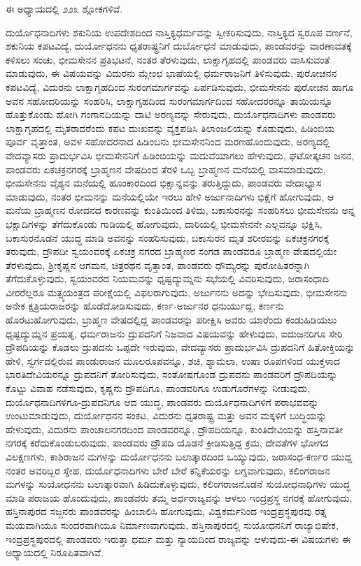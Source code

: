 ಈ ಅಧ್ಯಾಯದಲ್ಲಿ ೨೨೩ ಶ್ಲೋಕಗಳಿವೆ.

ದುರ್ಯೊಧನಾದಿಗಳು ಶಕುನಿಯ ಉಪದೇಶದಿಂದ ನಾಸ್ತಿಕ್ಯಧರ್ಮವನ್ನು ಸ್ವೀಕರಿಸುವುದು, ನಾಸ್ತಿಕ್ಯದ ಸ್ವರೂಪ ವರ್ಣನೆ, ಶಕುನಿಯ ಕಪಟವಿದ್ಯೆ, ದುರ್ಯೋಧನನು ಧೃತರಾಷ್ಟ್ರನಿಗೆ ದುರ್ಬೋಧನೆ ಮಾಡುವುದು, ಪಾಂಡವರನ್ನು ವಾರಣಾವತಕ್ಕೆ ಕಳಿಸಲು ಸಂಚು, ಭೀಮಸೇನನ ಪ್ರತಿಭಟನೆ, ನಂತರ ತೆರಳುವುದು, ಲಾಕ್ಷಾಗೃಹದಲ್ಲಿ ಪಾಂಡವರು ವಾಸಿಸುವಂತೆ ಮಾಡುವುದು, ಈ ವಿಷಯವನ್ನು ವಿದುರನು ಮ್ಲೇಂಛ ಭಾಷೆಯಲ್ಲಿ ಧರ್ಮರಾಜನಿಗೆ ತಿಳಿಸುವುದು, ಪುರೋಚನನ ಕಪಟವಿದ್ಯೆ, ವಿದುರನು ಲಾಕ್ಷಾಗೃಹದಿಂದ ಸುರಂಗಮಾರ್ಗವನ್ನು ಏರ್ಪಡಿಸುವುದು, ಭೀಮಸೇನನು ಪುರೋಚನ ಹಾಗೂ ಅವನ ಸಹೋದರಿ\-ಯನ್ನು ಸಂಹರಿಸಿ, ಲಾಕ್ಷಾಗೃಹದಿಂದ ಸುರಂಗಮಾರ್ಗದಿಂದ ಸಹೋದರರನ್ನೂ ತಾಯಿಯನ್ನೂ ಹೊತ್ತುಕೊಂಡು ಹೋಗಿ ಗಂಗಾನದಿಯನ್ನು ದಾಟಿ ಅರಣ್ಯವನ್ನು ಸೇರುವುದು, ದುರ್ಯೊಧನಾದಿಗಳು ಪಾಂಡವರು ಲಾಕ್ಷಾಗೃಹದಲ್ಲಿ ಮೃತರಾದರೆಂದು ಕಪಟ ದುಃಖವನ್ನು ವ್ಯಕ್ತಪಡಿಸಿ ತಿಲಾಂಜಲಿಯನ್ನು ಕೊಡುವುದು, ಹಿಡಿಂಬಿಯ ಪೂರ್ವ ವೃತ್ತಾಂತ, ಅವಳ ಸಹೋದರನಾದ ಹಿಡಿಂಬನು ಭೀಮಸೇನನಿಂದ ಮರಣಹೊಂದುವುದು, ಅರಣ್ಯದಲ್ಲಿ ವೇದವ್ಯಾಸರು ಪ್ರಾದುರ್ಭವಿಸಿ ಭೀಮಸೇನನಿಗೆ ಹಿಡಿಂಬಿಯನ್ನು ಮದುವೆಯಾಗಲು ಹೇಳುವುದು, ಘಟೋತ್ಕಚನ ಜನನ, ಪಾಂಡವರು ಏಕಚಕ್ರನಗರಕ್ಕೆ ಬ್ರಾಹ್ಮಣನ ವೇಷದಿಂದ ತೆರಳಿ ಒಬ್ಬ ಬ್ರಾಹ್ಮಣನ ಮನೆಯಲ್ಲಿ ವಾಸಮಾಡುವುದು, ಭೀಮಸೇನನು ವೈಶ್ಯನ ಮನೆಯಲ್ಲಿ ಹೂಂಕಾರದಿಂದ ಭಿಕ್ಷಾನ್ನವನ್ನು ತರುತ್ತಿದ್ದುದು, ಪಾಂಡವರು ವೇದಾಭ್ಯಾಸ ಮಾಡುವುದು, ನಂತರ ಭೀಮನನ್ನು ಮನೆಯಲ್ಲಿಯೇ ಇರಲು ಹೇಳಿ ಅರ್ಜುನಾದಿಗಳು ಭಿಕ್ಷೆಗೆ ಹೋಗುವುದು, ಆ ಮನೆಯ ಬ್ರಾಹ್ಮಣನ ರೋದನದ ಕಾರಣವನ್ನು ಕುಂತಿಯಿಂದ ತಿಳಿದು, ಬಕಾಸುರನನ್ನು ಸಂಹರಿಸಲು ಭೀಮಸೇನನು ಅನ್ನ ಭಕ್ಷಾದಿಗಳನ್ನು ತೆಗೆದುಕೊಂಡು ಗಾಡಿಯಲ್ಲಿ ಹೋಗುವುದು, ದಾರಿಯಲ್ಲಿ ಭೀಮಸೇನನೇ ಎಲ್ಲವನ್ನೂ ಭಕ್ಷಿಸಿ, ಬಕಾಸುರನೊಡನೆ ಯುದ್ಧ ಮಾಡಿ ಅವನನ್ನು ಸಂಹರಿಸುವುದು, ಬಕಾಸುರನ ಮೃತ ಶರೀರವನ್ನು ಏಕಚಕ್ರನಗರಕ್ಕೆ ತರುವುದು, ದ್ರೌಪದೀ ಸ್ವಯಂವರಕ್ಕೆ ಏಕಚಕ್ರ ನಗರದ ಬ್ರಾಹ್ಮಣರ ಸಂಗಡ ಪಾಂಡವರೂ ಬ್ರಾಹ್ಮಣ ವೇಷದಲ್ಲಿಯೇ ತೆರಳುವುದು, ಶ‍್ರೀಕೃಷ್ಣನ ಆಗಮನ, ಚಿತ್ರರಥನ ವೃತ್ತಾಂತ, ಪಾಂಡವರು ಧೌಮ್ಯರನ್ನು ಪುರೋಹಿತರನ್ನಾಗಿ ತೆಗೆದುಕೊಳ್ಳುವುದು, ಸ್ವಯಂವರದ ನಿಯಮವನ್ನು ಧೃಷ್ಟ\-ದ್ಯುಮ್ನನು ಸಭೆಯಲ್ಲಿ ವಿವರಿಸುವುದು, ಜರಾಸಂಧಾದಿ ವೀರರೆಲ್ಲರೂ ಮತ್ಸ್ಯಯಂತ್ರದ ಪರೀಕ್ಷೆಯಲ್ಲಿ ವಿಫಲರಾಗುವುದು, ಅರ್ಜುನನು ಅದನ್ನು ಭೇದಿಸುವುದು, ಭೀಮಸೇನನು ಅನೇಕ ಕ್ಷತ್ರಿಯರಾಜರನ್ನು ಹೊಡೆದೋಡಿಸುವುದು, ಕರ್ಣ-ಅರ್ಜುನರ ಧನುರ್ಯುದ್ದ, ಕರ್ಣನು ಹೊರಟುಹೋಗುವುದು, ಬ್ರಾಹ್ಮಣ ವೇಷದಲ್ಲಿದ್ದ ಪಾಂಡವರನ್ನು ಪರೀಕ್ಷಿಸಿ ಅವರು ಯಾರೆಂದು ಕಂಡುಹಿಡಿಯಲು ಧೃಷ್ಟದ್ಯುಮ್ನನ ಪ್ರಯತ್ನ, ಧರ್ಮರಾಜನು ದ್ರುಪದನಿಗೆ ನಿಜವಾದ ವಿಷಯವನ್ನು ಹೇಳುವುದು, ಐದುಜನರಿಗೂ ಸೇರಿ ದ್ರೌಪದಿಯನ್ನು ಕೊಡಲು ದ್ರುಪದನು ಒಪ್ಪದೇ ಇರುವುದು, ವೇದವ್ಯಾಸರು ಪ್ರಾದುರ್ಭವಿಸಿ ದ್ರುಪದನಿಗೆ ಹಿತೋಕ್ತಿಯನ್ನು ಹೇಳಿ, ಸ್ವರ್ಗದಲ್ಲಿರುವ ಪಾಂಡುರಾಜನ ಮೂಲರೂಪವನ್ನೂ, ಶಚಿ, ಶ್ಯಾಮಲಾ, ಉಷಾ ರೂಪಗಳಿಂದ ಯುಕ್ತಳಾದ ಭಾರತಿದೇವಿಯರನ್ನೂ ದ್ರುಪದನಿಗೆ ತೋರಿಸುವುದು, ಸಂತೋಷಗೊಂಡ ದ್ರುಪದನು ಪಾಂಡವರಿಗೆ ದ್ರೌಪದಿಯನ್ನು ಕೊಟ್ಟು ವಿವಾಹ ನಡೆಸುವುದು, ಕೃಷ್ಣನು ದ್ರೌಪದಿಗೂ, ಪಾಂಡವರಿಗೂ ಉಡುಗೊರೆಗಳನ್ನು ನೀಡುವುದು, ದುರ್ಯೊಧನಾದಿಗಳಿಗೂ-ದ್ರುಪದನಿಗೂ ಆದ ಯುದ್ಧ, ಪಾಂಡವರು ದುರ್ಯೊಧನಾದಿಗಳಿಗೆ ಪರಾಭವವನ್ನು ಉಂಟುಮಾಡುವುದು, ದುರ್ಯೋಧನನ ಸಂಕಟ, ವಿದುರನು ಧೃತರಾಷ್ಟ್ರ ಮತ್ತು ಅವನ ಮಕ್ಕಳಿಗೆ ಬುದ್ಧಿಯನ್ನು ಹೇಳುವುದು, ವಿದುರನು ಪಾಂಚಾಲನಗರದಿಂದ ಪಾಂಡವರನ್ನೂ, ದ್ರೌಪದಿಯನ್ನೂ, ಕುಂತಿದೇವಿಯನ್ನು ಹಸ್ತಿನಾವತೀ ನಗರಕ್ಕೆ ಕರೆದುಕೊಂಡುಬರುವುದು, ಪಾಂಡವರು ದ್ರೌಪದಿ ಯೊಡನೆ ಕ್ರೀಡಿಸುತ್ತಿದ್ದ ಕ್ರಮ, ದೇವತೆಗಳ ಭೋಗದ ವಿಲಕ್ಷಣಗಳು, ಕಾಶಿರಾಜನ ಮಗಳನ್ನು ದುರ್ಯೋಧನನು ಬಲಾತ್ಕಾರದಿಂದ ಒಯ್ಯುವುದು, ಜರಾ\-ಸಂಧ-ಕರ್ಣರ ಯುದ್ದ ನಂತರ ಅವರಿಬ್ಬರ ಸ್ನೇಹ, ದುರ್ಯೊಧನಾದಿಗಳು ಬೇರೆ ಬೇರೆ ಕನ್ನಿಕೆಯರನ್ನು ಲಗ್ನವಾಗುವುದು, ಕಲಿಂಗರಾಜನ ಮಗಳನ್ನು ಸುಯೋಧನನು ಬಲಾತ್ಕಾರವಾಗಿ ಹಿಡಿದುಕೊಳ್ಳುವುದು, ಕಲಿಂಗರಾಜನೊಡನೆ ಸುಯೋಧನಾಧಿಗಳು ಯುದ್ಧ ಮಾಡಿ ಪರಾಜಯ ಹೊಂದುವುದು, ಪಾಂಡವರು ತಮ್ಮ ಅರ್ಧರಾಜ್ಯವನ್ನು ಆಳಲು ಇಂದ್ರಪ್ರಸ್ಥ ನಗರಕ್ಕೆ ಹೋಗುವುದು, ಹಸ್ತಿನಾಪುರದ ಸಜ್ಜನರು ಪಾಂಡವರನ್ನು ಹಿಂಬಾಲಿಸಿ ಹೋಗುವುದು, ವಿಶ್ವಕರ್ಮನಿಂದ ಇಂದ್ರಪ್ರಸ್ಥಪುರವು ರತ್ನ ಮಯವಾಗಿಯೂ ಸುಂದರವಾಗಿಯೂ ನಿರ್ಮಾಣವಾಗುವುದು, ಹಸ್ತಿನಾಪುರದಲ್ಲಿ ಸುಯೋಧನನಿಗೆ ರಾಜ್ಯಾಭಿಷೇಕ, ಇಂದ್ರಪ್ರಸ್ಥಪುರದಲ್ಲಿ ಪಾಂಡವರು ಇರುತ್ತಾ ಧರ್ಮ ಮತ್ತು ನ್ಯಾಯದಿಂದ ರಾಜ್ಯವನ್ನು ಆಳುವುದು-ಈ ವಿಷಯಗಳು ಈ ಅಧ್ಯಾಯದಲ್ಲಿ ನಿರೂಪಿತವಾಗಿವೆ.


